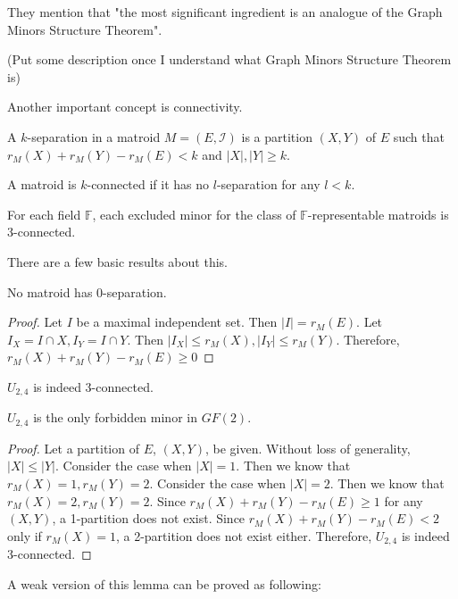 They mention that "the most significant ingredient is an analogue of the Graph Minors Structure Theorem".

(Put some description once I understand what Graph Minors Structure Theorem is)

Another important concept is connectivity.
\begin{defn}
A $k$-separation in a matroid $M = (E, \mathcal{I})$ is a partition $(X, Y)$ of $E$ such that $r_M(X) + r_M(Y) - r_M(E) < k$ and $\lvert X \rvert, \lvert Y \rvert \geq k$.
\end{defn}
\begin{defn}
A matroid is $k$-connected if it has no $l$-separation for any $l < k$.
\end{defn}

\begin{lem}
For each field $\mathbb{F}$, each excluded minor for the class of $\mathbb{F}$-representable matroids is 3-connected.
\end{lem}


There are a few basic results about this.

\begin{thm}
No matroid has 0-separation.
\end{thm}
\begin{proof}
Let $I$ be a maximal independent set.
Then $\lvert I \rvert = r_M(E)$.
Let $I_X = I \cap X, I_Y = I \cap Y$.
Then $\lvert I_X \rvert \leq r_M(X), \lvert I_Y \rvert \leq r_M(Y)$.
Therefore, $r_M(X) + r_M(Y) - r_M(E) \geq 0$
\end{proof}


\begin{thm}
$U_{2, 4}$ is indeed 3-connected.
\end{thm}
$U_{2, 4}$ is the only forbidden minor in $GF(2)$.
\begin{proof}
Let a partition of $E$, $(X, Y)$, be given.
Without loss of generality, $\lvert X \rvert \leq \lvert Y \rvert$.
Consider the case when $\lvert X \rvert = 1$.
Then we know that $r_M(X) = 1, r_M(Y) = 2$.
Consider the case when $\lvert X \rvert = 2$.
Then we know that $r_M(X) = 2, r_M(Y) = 2$.
Since $r_M(X) + r_M(Y) - r_M(E) \geq 1$ for any $(X, Y)$, a 1-partition does not exist.
Since $r_M(X) + r_M(Y) - r_M(E) < 2$ only if $r_M(X) = 1$, a 2-partition does not exist either.
Therefore, $U_{2, 4}$ is indeed 3-connected.
\end{proof}

A weak version of this lemma can be proved as following:

